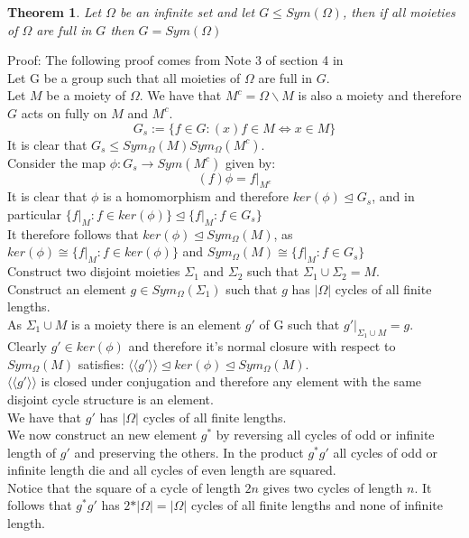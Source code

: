 \documentclass{report}
\newtheorem{theorem}{Theorem}[section]
\begin{document}
\begin{theorem}\label{full moiety}
Let $\Omega$ be an infinite set and let $G\leq Sym(\Omega)$, then if all moieties of $\Omega$ are full in $G$ then $G=Sym(\Omega)$
\end{theorem}\par
Proof: The following proof comes from Note 3 of section 4 in \cite{notes}\\
Let G be a group such that all moieties of $\Omega$ are full in $G$.\\
Let $M$ be a moiety of $\Omega$. We have that $M^c = \Omega \backslash M$ is also a moiety and therefore $G$ acts on fully on $M$ and $M^c$.
\[G_s:= \{f \in G: (x)f \in M  \iff x \in M\}\]
 It is clear that $G_s \leq Sym_{\Omega}(M)Sym_{\Omega}(M^c)$.\\
 Consider the map $\phi:G_s \rightarrow Sym(M^c)$ given by:
 \[(f)\phi = f\vert_{M^c}\]
 It is clear that $\phi$ is a homomorphism and therefore $ker(\phi) \unlhd G_s$, and in particular $\{f \vert_{M}:f \in ker(\phi)\}\unlhd \{ f \vert_{M} :f \in G_s\}$\\
It therefore follows that $ker(\phi) \unlhd Sym_{\Omega}(M)$, as $ker(\phi) \cong \{f \vert_{M}:f \in ker(\phi)\}$ and $Sym_{\Omega}(M) \cong \{ f \vert_{M} :f \in G_s\}$\\
 Construct two disjoint moieties $\Sigma_1$ and $\Sigma_2$ such that $\Sigma_1 \cup \Sigma_2 = M$.\\
 Construct an element $g \in Sym_{\Omega}(\Sigma_1)$ such that $g$ has $\vert \Omega \vert $ cycles of all finite lengths.\\
As $\Sigma_1 \cup M$ is a moiety there is an element $g'$ of G such that $g'\vert_{\Sigma_1 \cup M} = g$.\\
Clearly $g' \in ker(\phi)$ and therefore it's normal closure with respect to $Sym_{\Omega}(M)$ satisfies: $\langle \langle g'\rangle \rangle \unlhd ker(\phi) \unlhd Sym_{\Omega}(M)$.\\
$\langle \langle g'\rangle \rangle$ is closed under conjugation and therefore any element with the same disjoint cycle structure is an element.\\
We have that $g'$ has $\vert \Omega \vert$ cycles of all finite lengths.\\ We now construct an new element $g^*$ by reversing all cycles of odd or infinite length of $g'$ and preserving the others. In the product $g^* g'$ all cycles of odd or infinite length die and all cycles of even length are squared.\\ Notice that the square of a cycle of length $2n$ gives two cycles of length $n$. It follows that $g^* g'$ has $2*\vert \Omega \vert=\vert \Omega \vert$ cycles of all finite lengths and none of infinite length.\\
\end{document}

